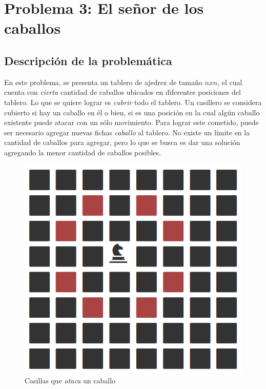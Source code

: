 \section{Problema 3: El se\~nor de los caballos}
\subsection{Descripci\'on de la problem\'atica}

En este problema, se presenta un tablero de ajedrez de tama\~no $nxn$, el cual cuenta con \emph{cierta} cantidad de caballos ubicados en diferentes posiciones del tablero. Lo que se quiere lograr es \emph{cubrir} todo el tablero. Un casillero se considera cubierto si hay un caballo en \'el o bien, si es una posici\'on en la cual alg\'un caballo existente puede atacar con un s\'olo movimiento. Para lograr este cometido, puede ser necesario agregar nuevas fichas \emph{caballo} al tablero. No existe un l\'imite en la cantidad de caballos para agregar, pero lo que se busca es dar una soluci\'on agregando la menor cantidad de caballos posibles.\\

 \begin{figure}[h!]
   \begin{center}
 	\includegraphics[scale=0.4]{imagenes/ej3/unCaballo.png}
 	\caption{Casillas que \emph{ataca} un caballo}
   \end{center}
 \end{figure}

